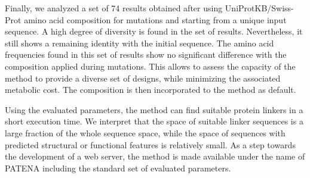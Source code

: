 Finally, we analyzed a set of 74 results obtained after using UniProtKB/Swiss-Prot amino acid composition for mutations and starting from a unique input sequence.
A high degree of diversity is found in the set of results. Nevertheless, it still shows a remaining identity with the initial sequence.
The amino acid frequencies found in this set of results show no significant difference with the composition applied during mutations. 
This allows to assess the capacity of the method to provide a diverse set of designs, while minimizing the associated metabolic cost.
The composition is then incorporated to the method as default.


Using the evaluated parameters, the method can find suitable protein linkers in a short execution time. 
We interpret that the space of suitable linker sequences is a large fraction of the whole sequence space, 
while the space of sequences with predicted structural or functional features is relatively small.
As a step towards the development of a web server, the method is made available under the name of PATENA including the standard set of evaluated parameters.

